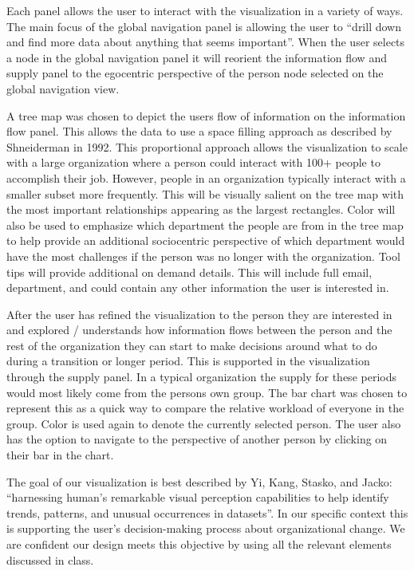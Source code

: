 \documentclass{soups}
\begin{document}
Each panel allows the user to interact with the visualization in a variety of ways.  The main focus of the global navigation panel is allowing the user to “drill down and find more data about anything that seems important”\cite{ware2012information}.  When the user selects a node in the global navigation panel it will reorient the information flow and supply panel to the egocentric perspective of the person node selected on the global navigation view.

A tree map was chosen to depict the users flow of information on the information flow panel.  This allows the data to use a space filling approach as described by Shneiderman in 1992\cite{shneiderman1992tree}.  This proportional approach allows the visualization to scale with a large organization where a person could interact with 100+ people to accomplish their job.  However, people in an organization typically interact with a smaller subset more frequently.  This will be visually salient\cite{ware2012information} on the tree map with the most important relationships appearing as the largest rectangles.  Color will also be used to emphasize\cite{ware2012information} which department the people are from in the tree map to help provide an additional sociocentric perspective of which department would have the most challenges if the person was no longer with the organization.  Tool tips will provide additional on demand details\cite{anafigueiras}.  This will include full email, department, and could contain any other information the user is interested in.

After the user has refined the visualization to the person they are interested in and explored / understands how information flows between the person and the rest of the organization they can start to make decisions around what to do during a transition or longer period.  This is supported in the visualization through the supply panel.  In a typical organization the supply for these periods would most likely come from the persons own group.  The bar chart was chosen to represent this as a quick way to compare the relative workload of everyone in the group.  Color is used again to denote the currently selected person.  The user also has the option to navigate to the perspective of another person by clicking on their bar in the chart.

The goal of our visualization is best described by Yi, Kang, Stasko, and Jacko: “harnessing human’s remarkable visual perception capabilities to help identify trends, patterns, and unusual occurrences in datasets”\cite{yi2007toward}.  In our specific context this is supporting the user’s decision-making process about organizational change.  We are confident our design meets this objective by using all the relevant elements discussed in class.
\end{document}
